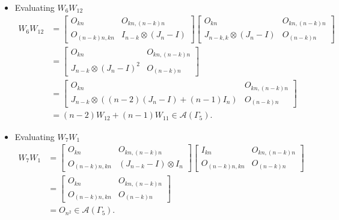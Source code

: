 \begin{itemize}
\item Evaluating $W_{6}W_{12}$
\begin{align*}
    W_6W_{12}
    &= \begin{bmatrix}
        O_{kn} & O_{kn, (n-k)n} \\
        O_{(n-k)n,kn} & I_{n - k} \otimes (J_n - I)
    \end{bmatrix}
    \begin{bmatrix}
        O_{kn} & O_{kn, (n-k)n} \\
        J_{n-k,k}\otimes (J_n - I) & O_{(n-k)n}
    \end{bmatrix}\\
    &= \begin{bmatrix}
        O_{kn} & O_{kn, (n-k)n} \\
        J_{n - k} \otimes (J_n - I)^2 & O_{(n - k)n}
    \end{bmatrix}\\
    &= \begin{bmatrix}
        O_{kn} & O_{kn, (n-k)n} \\
        J_{n - k} \otimes ((n-2)(J_n - I) + (n-1)I_n) & O_{(n - k)n}
    \end{bmatrix}\\
    &= (n-2)W_{12} + (n-1)W_{11} \in\mathcal{A}(\Gamma_5).
\end{align*}

\item Evaluating $W_{7}W_{1}$
\begin{align*}
    W_7W_1
    &= \begin{bmatrix}
        O_{kn} & O_{kn, (n-k)n} \\
        O_{(n-k)n,kn} & (J_{n - k} - I) \otimes I_n
    \end{bmatrix}
    \begin{bmatrix}
        I_{kn} & O_{kn, (n-k)n} \\
        O_{(n-k)n,kn} & O_{(n - k)n}
    \end{bmatrix}\\
    &= \begin{bmatrix}
        O_{kn} & O_{kn, (n-k)n} \\
        O_{(n-k)n,kn} & O_{(n - k)n}
    \end{bmatrix}\\
    &= O_{n^2} \in\mathcal{A}(\Gamma_5).
\end{align*}


\end{itemize}
